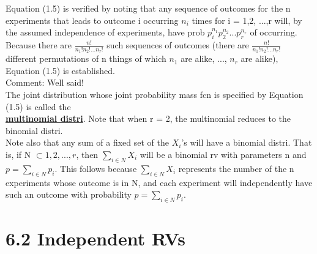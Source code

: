 \documentclass{article}
\begin{document}
Equation (1.5) is verified by noting that any sequence of outcomes for the n experiments that leads to outcome i occurring $n_i$ times for i = 1,2, ...,r will, by the assumed independence of experiments, have prob $p_i^{n_1}p_2^{n_2}...p_r^{n_r}$ of occurring. Because there are $\frac{n!}{n_1!n_2!...n_r!}$ such sequences of outcomes (there are $\frac{n!}{n_1!n_2!...n_r!}$ different permutations of n things of which $n_1$ are alike, ..., $n_r$ are alike), Equation (1.5) is established.\\
Comment: Well said! \\
The joint distribution whose joint probability mass fcn is specified by Equation (1.5) is called the \\
\underline{\textbf{multinomial distri}}. Note that when r = 2, the multinomial reduces to the binomial distri. \\
Note also that any sum of a fixed set of the $X_i$'s will have a binomial distri. That is, if N $\subset {1,2,...,r}$, then $\sum_{i \in N}X_i$ will be a binomial rv with parameters n and $p=\sum_{i \in N} p_i$. This follows because $\sum_{i \in N}X_i$ represents the number of the n experiments whose outcome is in N, and each experiment will independently have such an outcome with probability $p=\sum_{i \in N} p_i$. 
\section*{6.2 Independent RVs}



\end{document}
